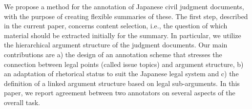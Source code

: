 We propose a method for the annotation of Japanese civil judgment documents, with the purpose of creating flexible summaries of these. The first step, described in the current paper, concerns content selection, i.e., the question of which material should be extracted initially for the summary. In particular, we utilize the hierarchical argument structure of the judgment documents. Our main contributions are a) the design of an annotation scheme that stresses the connection between legal points (called issue topics) and argument structure, b) an adaptation of rhetorical status to suit the Japanese legal system and c) the definition of a linked argument structure based on legal sub-arguments. In this paper, we report agreement between two annotators on several aspects of the overall task.
